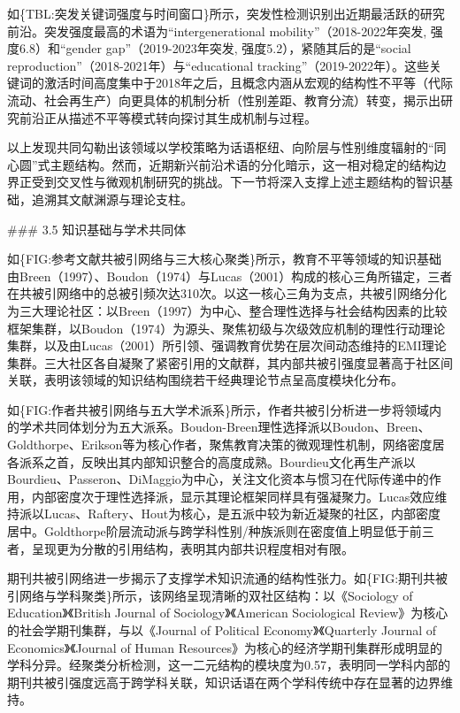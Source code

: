 \documentclass[12pt,a4paper]{article}
\begin{document}
如\{TBL:突发关键词强度与时间窗口\}所示，突发性检测识别出近期最活跃的研究前沿。突发强度最高的术语为“intergenerational mobility”（2018-2022年突发, 强度6.8）和“gender gap”（2019-2023年突发, 强度5.2），紧随其后的是“social reproduction”（2018-2021年）与“educational tracking”（2019-2022年）。这些关键词的激活时间高度集中于2018年之后，且概念内涵从宏观的结构性不平等（代际流动、社会再生产）向更具体的机制分析（性别差距、教育分流）转变，揭示出研究前沿正从描述不平等模式转向探讨其生成机制与过程。

以上发现共同勾勒出该领域以学校策略为话语枢纽、向阶层与性别维度辐射的“同心圆”式主题结构。然而，近期新兴前沿术语的分化暗示，这一相对稳定的结构边界正受到交叉性与微观机制研究的挑战。下一节将深入支撑上述主题结构的智识基础，追溯其文献渊源与理论支柱。

\#\#\# 3.5 知识基础与学术共同体

如\{FIG:参考文献共被引网络与三大核心聚类\}所示，教育不平等领域的知识基础由Breen（1997）、Boudon（1974）与Lucas（2001）构成的核心三角所锚定，三者在共被引网络中的总被引频次达310次。以这一核心三角为支点，共被引网络分化为三大理论社区：以Breen（1997）为中心、整合理性选择与社会结构因素的比较框架集群，以Boudon（1974）为源头、聚焦初级与次级效应机制的理性行动理论集群，以及由Lucas（2001）所引领、强调教育优势在层次间动态维持的EMI理论集群。三大社区各自凝聚了紧密引用的文献群，其内部共被引强度显著高于社区间关联，表明该领域的知识结构围绕若干经典理论节点呈高度模块化分布。

如\{FIG:作者共被引网络与五大学术派系\}所示，作者共被引分析进一步将领域内的学术共同体划分为五大派系。Boudon-Breen理性选择派以Boudon、Breen、Goldthorpe、Erikson等为核心作者，聚焦教育决策的微观理性机制，网络密度居各派系之首，反映出其内部知识整合的高度成熟。Bourdieu文化再生产派以Bourdieu、Passeron、DiMaggio为中心，关注文化资本与惯习在代际传递中的作用，内部密度次于理性选择派，显示其理论框架同样具有强凝聚力。Lucas效应维持派以Lucas、Raftery、Hout为核心，是五派中较为新近凝聚的社区，内部密度居中。Goldthorpe阶层流动派与跨学科性别/种族派则在密度值上明显低于前三者，呈现更为分散的引用结构，表明其内部共识程度相对有限。

期刊共被引网络进一步揭示了支撑学术知识流通的结构性张力。如\{FIG:期刊共被引网络与学科聚类\}所示，该网络呈现清晰的双社区结构：以《Sociology of Education》《British Journal of Sociology》《American Sociological Review》为核心的社会学期刊集群，与以《Journal of Political Economy》《Quarterly Journal of Economics》《Journal of Human Resources》为核心的经济学期刊集群形成明显的学科分异。经聚类分析检测，这一二元结构的模块度为0.57，表明同一学科内部的期刊共被引强度远高于跨学科关联，知识话语在两个学科传统中存在显著的边界维持。
\end{document}
